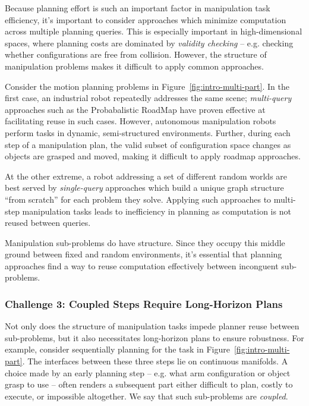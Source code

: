 Because planning effort is such an important factor in
manipulation task efficiency,
it's important to consider approaches which minimize computation
across multiple planning queries.
This is especially important in high-dimensional spaces,
where planning costs are dominated by \emph{validity checking} --
e.g. checking whether configurations are free from collision.
However, the structure of manipulation problems
makes it difficult to apply common approaches.

Consider the motion planning problems in
Figure~\ref{fig:intro-multi-part}.
In the first case,
an industrial robot repeatedly addresses the same scene;
\emph{multi-query} approaches such as the Probabalistic RoadMap
\cite{kavrakietal1996prm}
have proven effective at facilitating reuse in such cases.
However,
autonomous manipulation robots perform tasks
in dynamic, semi-structured environments.
Further,
during each step of a manipulation plan,
the valid subset of configuration space changes
as objects are grasped and moved,
making it difficult to apply roadmap approaches.

At the other extreme,
a robot addressing a set of different random worlds
are best served by \emph{single-query} approaches
which build a unique graph structure ``from scratch''
for each problem they solve.
Applying such approaches to multi-step manipulation tasks
leads to inefficiency in planning
as computation is not reused between queries.

Manipulation sub-problems do have structure.
Since they occupy this middle ground between
fixed and random environments,
it's essential that planning approaches
find a way to reuse computation effectively
between inconguent sub-problems.

\subsubsection*{Challenge 3: Coupled Steps Require Long-Horizon Plans}

Not only does the structure of manipulation tasks
impede planner reuse between sub-problems,
but it also necessitates long-horizon plans to ensure robustness.
For example,
consider sequentially planning for the task in
Figure~\ref{fig:intro-multi-part}.
The interfaces between these three steps lie on continuous manifolds.
A choice made by an early planning step
-- e.g. what arm configuration or object grasp to use --
often renders a subsequent part either difficult to plan,
costly to execute, or impossible altogether.
We say that such sub-problems are \emph{coupled}.

